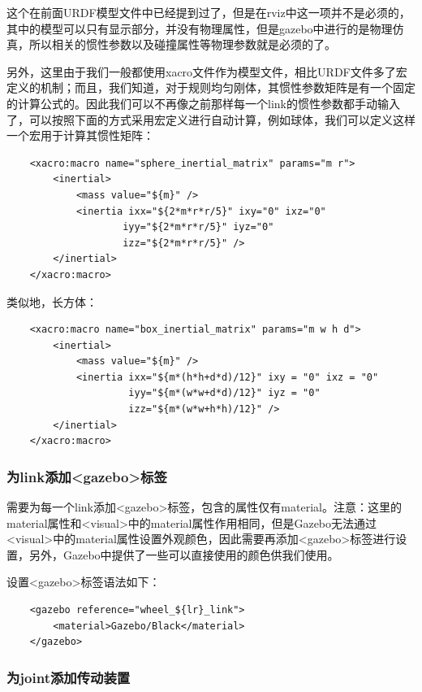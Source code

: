 \documentclass[9pt, oneside]{book}
\begin{document}
这个在前面URDF模型文件中已经提到过了，但是在rviz中这一项并不是必须的，其中的模型可以只有显示部分，并没有物理属性，但是gazebo中进行的是物理仿真，所以相关的惯性参数以及碰撞属性等物理参数就是必须的了。

另外，这里由于我们一般都使用xacro文件作为模型文件，相比URDF文件多了宏定义的机制；而且，我们知道，对于规则均匀刚体，其惯性参数矩阵是有一个固定的计算公式的。因此我们可以不再像之前那样每一个link的惯性参数都手动输入了，可以按照下面的方式采用宏定义进行自动计算，例如球体，我们可以定义这样一个宏用于计算其惯性矩阵：

\begin{verbatim}
    <xacro:macro name="sphere_inertial_matrix" params="m r">
        <inertial>
            <mass value="${m}" />
            <inertia ixx="${2*m*r*r/5}" ixy="0" ixz="0"
                    iyy="${2*m*r*r/5}" iyz="0" 
                    izz="${2*m*r*r/5}" />
        </inertial>
    </xacro:macro>
\end{verbatim}

类似地，长方体：

\begin{verbatim}
    <xacro:macro name="box_inertial_matrix" params="m w h d">
        <inertial>
            <mass value="${m}" />
            <inertia ixx="${m*(h*h+d*d)/12}" ixy = "0" ixz = "0"
                     iyy="${m*(w*w+d*d)/12}" iyz = "0"
                     izz="${m*(w*w+h*h)/12}" /> 
        </inertial>
    </xacro:macro>
\end{verbatim}

\subsubsection{为link添加<gazebo>标签}

需要为每一个link添加<gazebo>标签，包含的属性仅有material。注意：这里的material属性和<visual>中的material属性作用相同，但是Gazebo无法通过<visual>中的material属性设置外观颜色，因此需要再添加<gazebo>标签进行设置，另外，Gazebo中提供了一些可以直接使用的颜色供我们使用。

设置<gazebo>标签语法如下：

\begin{verbatim}
    <gazebo reference="wheel_${lr}_link">
        <material>Gazebo/Black</material>
    </gazebo>
\end{verbatim}

\subsubsection{为joint添加传动装置}
\end{document}
